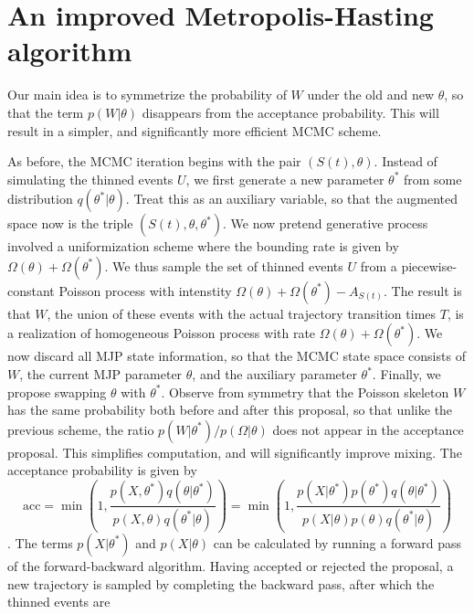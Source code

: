 
\section{An improved Metropolis-Hasting algorithm}

Our main idea is to symmetrize the probability of $W$ under the old and new 
$\theta$, so that the term
$p(W|\theta)$ disappears from the acceptance probability. This will result
in a simpler, and significantly more efficient MCMC scheme.

As before, the MCMC iteration begins with the pair $(S(t), \theta)$. 
Instead of simulating the thinned events $U$, we first generate a new parameter 
$\theta^*$ from some distribution $q(\theta^*|\theta)$. Treat this as an 
auxiliary variable, so that the augmented space now is the triple 
$(S(t), \theta,\theta^*)$. We now pretend generative process involved a 
uniformization scheme
where the bounding rate is given by $\Omega(\theta) + \Omega(\theta^*)$.
We thus sample the set of thinned events $U$ from a piecewise-constant
Poisson process with intenstity $\Omega(\theta) + \Omega(\theta^*) - 
A_{S(t)}$. The result is that $W$, the union of these events with the actual
trajectory transition times $T$, is a realization of homogeneous Poisson
process with rate $\Omega(\theta) + \Omega(\theta^*)$. We now discard all MJP 
state information, so that the MCMC state space consists of $W$, the current
MJP parameter $\theta$, and the auxiliary parameter $\theta^*$.
Finally, we propose swapping $\theta$ with $\theta^*$. Observe from
symmetry that the Poisson skeleton $W$ has the same probability both
before and after this proposal, so that unlike the previous scheme,
the ratio $p(W|\theta^*)/p(\Omega|\theta)$ does not appear in the acceptance 
proposal. This simplifies computation, and will significantly improve mixing.
The acceptance probability 
is given by
$$ \text{acc} = 
  \min\left(1, \frac{p(X,\theta^*)q(\theta|\theta^*)}
   {p(X,\theta)q(\theta^*|\theta)}\right) = 
  \min\left(1, \frac{p(X|\theta^*)p(\theta^*)q(\theta|\theta^*)}
   {p(X|\theta)p(\theta)q(\theta^*|\theta)}\right)
   $$.
   The terms $p(X|\theta^*)$ and  $p(X|\theta)$ can be calculated by 
   running a forward pass of the forward-backward algorithm. Having
   accepted or rejected the proposal, a new trajectory is sampled by
   completing the backward pass, after which the thinned events are
